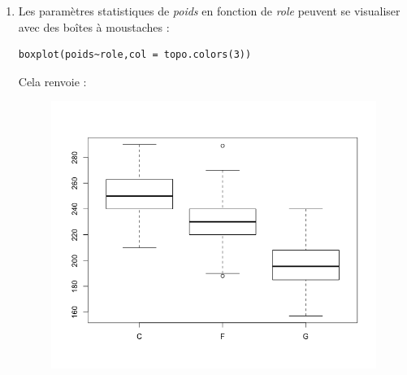 \begin{enumerate}
\item Les paramètres statistiques de \textit{poids} en fonction de \textit{role} peuvent se visualiser avec des boîtes à moustaches :
\begin{lstlisting}[language=html]
boxplot(poids~role,col = topo.colors(3))
\end{lstlisting}
Cela renvoie :
\begin{figure}[H]\begin{center}\includegraphics[scale=0.4]{ilu/gra85.png}\end{center}\end{figure}


\end{enumerate}
